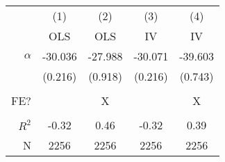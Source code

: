 \begin{tabular}{r|cccc}
 & (1) & (2) & (3) & (4) \\ 
& OLS & OLS & IV & IV \\\hline 
$\alpha$ & -30.036 & -27.988  & -30.071  & -39.603 \\ 
& (0.216) & (0.918) & (0.216) & (0.743) \\ 
 &&&& \\ 
FE? & & X & & X \\ 
 &&&& \\ 
$R^2$ & -0.32 & 0.46 & -0.32 & 0.39 \\
N & 2256 & 2256 & 2256 & 2256 \\\hline 
\end{tabular}